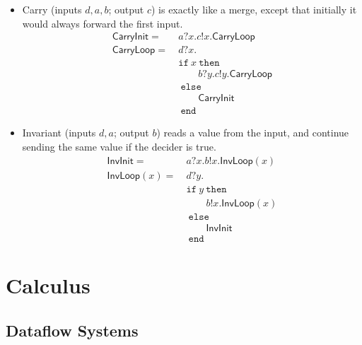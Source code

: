\documentclass{article}
\theoremstyle{definition}
\newcommand{\ite}[3]{\texttt{if}\ #1\ \texttt{then}\ #2\ \texttt{else}\ #3\ \texttt{end}}
\begin{document}
\begin{itemize}
\begin{itemize}
        \item Carry (inputs $d, a, b$; output $c$) is exactly like a merge, except that initially it would always forward the first input.
        \begin{align*}
            \mathsf{CarryInit} =&\ a?x. c!x. \mathsf{CarryLoop} \\
            \mathsf{CarryLoop} =&\ d?x. \\
                                &\ \ite{x}{\\
                                &\ \qquad b?y. c!y. \mathsf{CarryLoop} \\
                                &\ }{ \\
                                &\ \qquad \mathsf{CarryInit} \\
                                &\ }
        \end{align*}

        \item Invariant (inputs $d, a$; output $b$) reads a value from the input, and continue sending the same value if the decider is true.
        \begin{align*}
            \mathsf{InvInit} =&\ a?x. b!x. \mathsf{InvLoop}(x) \\
            \mathsf{InvLoop}(x) =&\ d?y. \\
                                &\ \ite{y}{\\
                                &\ \qquad b!x. \mathsf{InvLoop}(x) \\
                                &\ }{ \\
                                &\ \qquad \mathsf{InvInit} \\
                                &\ }
        \end{align*}
    \end{itemize}
\end{itemize}

\section{Calculus}
\label{sec:calculus}

\subsection{Dataflow Systems}
\label{sec:calculus:systems}
\end{document}

